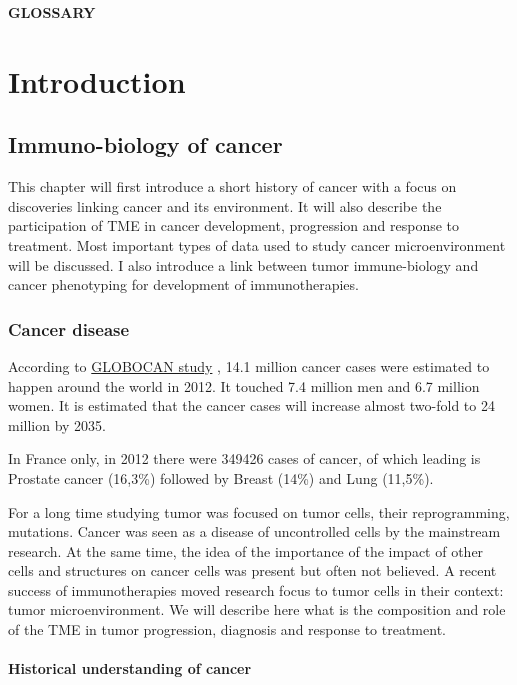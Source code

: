 \documentclass[12pt,]{book}
\theoremstyle{definition}
\theoremstyle{definition}
\theoremstyle{definition}
\theoremstyle{remark}
\begin{document}
\textbf{GLOSSARY}

\hypertarget{part-introduction}{%
\part{Introduction}\label{part-introduction}}

\hypertarget{intro}{%
\chapter{Immuno-biology of cancer}\label{intro}}

This chapter will first introduce a short history of cancer with a focus
on discoveries linking cancer and its environment. It will also describe
the participation of TME in cancer development, progression and response
to treatment. Most important types of data used to study cancer
microenvironment will be discussed. I also introduce a link between
tumor immune-biology and cancer phenotyping for development of
immunotherapies.

\hypertarget{cancer-disease}{%
\section{Cancer disease}\label{cancer-disease}}

According to
\href{http://globocan.iarc.fr/Pages/fact_sheets_cancer.aspx}{GLOBOCAN
study} \citep{GLOBOCAN}, 14.1 million cancer cases were estimated to
happen around the world in 2012. It touched 7.4 million men and 6.7
million women. It is estimated that the cancer cases will increase
almost two-fold to 24 million by 2035.

In France only, in 2012 there were 349426 cases of cancer, of which
leading is Prostate cancer (16,3\%) followed by Breast (14\%) and Lung
(11,5\%).

For a long time studying tumor was focused on tumor cells, their
reprogramming, mutations. Cancer was seen as a disease of uncontrolled
cells by the mainstream research. At the same time, the idea of the
importance of the impact of other cells and structures on cancer cells
was present but often not believed. A recent success of immunotherapies
moved research focus to tumor cells in their context: tumor
microenvironment. We will describe here what is the composition and role
of the TME in tumor progression, diagnosis and response to treatment.

\hypertarget{hist}{%
\subsection{Historical understanding of cancer}\label{hist}}
\end{document}
